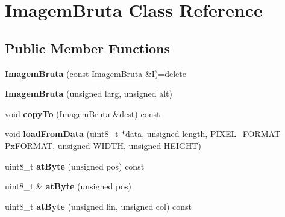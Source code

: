 \hypertarget{classImagemBruta}{}\section{Imagem\+Bruta Class Reference}
\label{classImagemBruta}
\subsection*{Public Member Functions}
\begin{DoxyCompactItemize}
\item 
{\bfseries Imagem\+Bruta} (const \hyperlink{classImagemBruta}{Imagem\+Bruta} \&I)=delete\hypertarget{classImagemBruta_a838aff9c2ef65563e22dac8c14635c1f}{}\label{classImagemBruta_a838aff9c2ef65563e22dac8c14635c1f}

\item 
{\bfseries Imagem\+Bruta} (unsigned larg, unsigned alt)\hypertarget{classImagemBruta_afbe010a51d6ad61a17bee6eaa98fab51}{}\label{classImagemBruta_afbe010a51d6ad61a17bee6eaa98fab51}

\item 
void {\bfseries copy\+To} (\hyperlink{classImagemBruta}{Imagem\+Bruta} \&dest) const \hypertarget{classImagemBruta_a2836f2b863c0797393a1b1f4216bf83a}{}\label{classImagemBruta_a2836f2b863c0797393a1b1f4216bf83a}

\item 
void {\bfseries load\+From\+Data} (uint8\+\_\+t $\ast$data, unsigned length, P\+I\+X\+E\+L\+\_\+\+F\+O\+R\+M\+AT Px\+F\+O\+R\+M\+AT, unsigned W\+I\+D\+TH, unsigned H\+E\+I\+G\+HT)\hypertarget{classImagemBruta_a04ae45e70b3f634bf7ec19ec6f2aa296}{}\label{classImagemBruta_a04ae45e70b3f634bf7ec19ec6f2aa296}

\item 
uint8\+\_\+t {\bfseries at\+Byte} (unsigned pos) const \hypertarget{classImagemBruta_a0f5def4b523db811ea2ef7b6dbe4e7d1}{}\label{classImagemBruta_a0f5def4b523db811ea2ef7b6dbe4e7d1}

\item 
uint8\+\_\+t \& {\bfseries at\+Byte} (unsigned pos)\hypertarget{classImagemBruta_aaa38236cf6eae1453d6110307f426987}{}\label{classImagemBruta_aaa38236cf6eae1453d6110307f426987}

\item 
uint8\+\_\+t {\bfseries at\+Byte} (unsigned lin, unsigned col) const \hypertarget{classImagemBruta_ae8e741d1cc510e3999c2b4534900d393}{}\label{classImagemBruta_ae8e741d1cc510e3999c2b4534900d393}


\end{DoxyCompactItemize}
